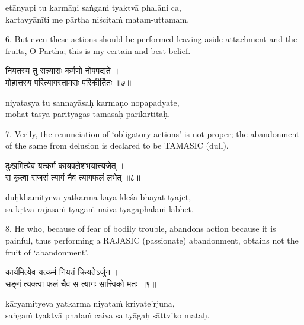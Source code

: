 \begin{transliteration}
etānyapi tu karmāṇi saṅgaṁ tyaktvā phalāni ca, \\
kartavyānīti me pārtha niścitaṁ matam-uttamam.
\end{transliteration}

6. But even these actions should be performed leaving aside attachment and the
fruits, O Partha; this is my certain and best belief.

\begin{gitaverse}
नियतस्य तु सन्न्यासः कर्मणो नोपपद्यते । \\
मोहात्तस्य परित्यागस्तामसः परिकीर्तितः ॥७॥
\end{gitaverse}

\begin{transliteration}
niyatasya tu sannayāsaḥ karmaṇo nopapadyate, \\
mohāt-tasya parityāgas-tāmasaḥ parikīrtitaḥ.
\end{transliteration}

7. Verily, the renunciation of `obligatory actions' is not proper; the
abandonment of the same from delusion is declared to be TAMASIC (dull).

\begin{gitaverse}
दुःखमित्येव यत्कर्म कायक्लेशभयात्त्यजेत् । \\
स कृत्वा राजसं त्यागं नैव त्यागफलं लभेत् ॥८॥
\end{gitaverse}

\begin{transliteration}
duḥkhamityeva yatkarma kāya-kleśa-bhayāt-tyajet, \\
sa kṛtvā rājasaṁ tyāgaṁ naiva tyāgaphalaṁ labhet.
\end{transliteration}

8. He who, because of fear of bodily trouble, abandons action because it is
painful, thus performing a RAJASIC (passionate) abandonment, obtains not the
fruit of `abandonment'.

\begin{gitaverse}
कार्यमित्येव यत्कर्म नियतं क्रियतेऽर्जुन । \\
सङ्गं त्यक्त्वा फलं चैव स त्यागः सात्त्विको मतः ॥९॥
\end{gitaverse}

\begin{transliteration}
kāryamityeva yatkarma niyataṁ kriyate'rjuna, \\
saṅgaṁ tyaktvā phalaṁ caiva sa tyāgaḥ sāttviko mataḥ.
\end{transliteration}

